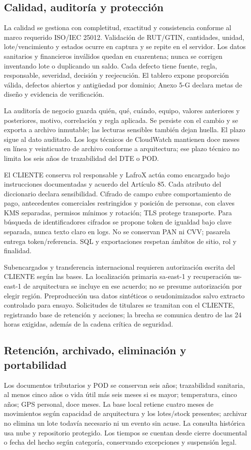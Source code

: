 \subsection{Calidad, auditoría y protección}
La calidad se gestiona con completitud, exactitud y consistencia conforme al marco requerido ISO/IEC 25012. Validación de RUT/GTIN, cantidades, unidad, lote/vencimiento y estados ocurre en captura y se repite en el servidor. Los datos sanitarios y financieros inválidos quedan en cuarentena; nunca se corrigen inventando lote o duplicando un saldo. Cada defecto tiene fuente, regla, responsable, severidad, decisión y reejecución. El tablero expone proporción válida, defectos abiertos y antigüedad por dominio; Anexo 5-G declara metas de diseño y evidencia de verificación.

La auditoría de negocio guarda quién, qué, cuándo, equipo, valores anteriores y posteriores, motivo, correlación y regla aplicada. Se persiste con el cambio y se exporta a archivo inmutable; las lecturas sensibles también dejan huella. El plazo sigue al dato auditado. Los logs técnicos de CloudWatch mantienen doce meses en línea y veinticuatro de archivo conforme a arquitectura; ese plazo técnico no limita los seis años de trazabilidad del DTE o POD.

El CLIENTE conserva rol responsable y LafroX actúa como encargado bajo instrucciones documentadas y acuerdo del Artículo 85. Cada atributo del diccionario declara sensibilidad. Cifrado de campo cubre comportamiento de pago, antecedentes comerciales restringidos y posición de personas, con claves KMS separadas, permisos mínimos y rotación; TLS protege transporte. Para búsqueda de identificadores cifrados se propone token de igualdad bajo clave separada, nunca texto claro en logs. No se conservan PAN ni CVV; pasarela entrega token/referencia. SQL y exportaciones respetan ámbitos de sitio, rol y finalidad.

Subencargados y transferencia internacional requieren autorización escrita del CLIENTE según las bases. La localización primaria sa-east-1 y recuperación us-east-1 de arquitectura se incluye en ese acuerdo; no se presume autorización por elegir región. Preproducción usa datos sintéticos o seudonimizados salvo extracto controlado para ensayo. Solicitudes de titulares se tramitan con el CLIENTE, registrando base de retención y acciones; la brecha se comunica dentro de las 24 horas exigidas, además de la cadena crítica de seguridad.

\subsection{Retención, archivado, eliminación y portabilidad}
Los documentos tributarios y POD se conservan seis años; trazabilidad sanitaria, al menos cinco años o vida útil más seis meses si es mayor; temperatura, cinco años; GPS personal, doce meses. La base local retiene cuatro meses de movimientos según capacidad de arquitectura y los lotes/stock presentes; archivar no elimina un lote todavía necesario ni un evento sin acuse. La consulta histórica usa nube y repositorio protegido. Los tiempos se cuentan desde cierre documental o fecha del hecho según categoría, conservando excepciones y suspensión legal.

